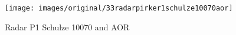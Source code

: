 \begin{figure}[!h] 
\centering 
\texttt{[image: images/original/33radarpirker1schulze10070aor]}
\caption{Radar P1 Schulze 10070 and AOR}
\label{fig:33radarpirker1schulze10070aor} 
\end{figure}

